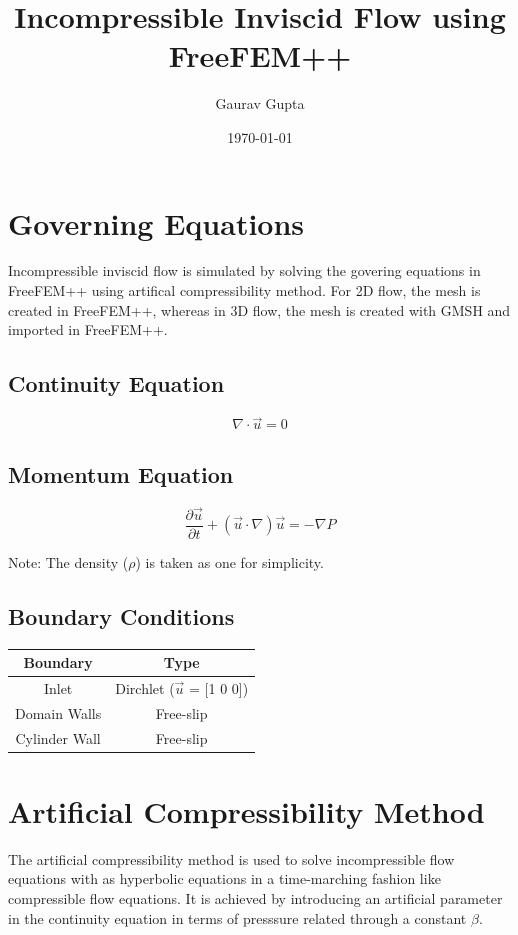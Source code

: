 \documentclass{article}
\title{Incompressible Inviscid Flow using FreeFEM++}
\author{Gaurav Gupta}
\date{\today}
\begin{document}
\maketitle %
\section{Governing Equations}
Incompressible inviscid flow is simulated by solving the govering equations in FreeFEM++
using artifical compressibility method. For 2D flow, the mesh is created in FreeFEM++, whereas
in 3D flow, the mesh is created with GMSH and imported in FreeFEM++.
\subsection*{Continuity Equation}
$$\nabla \cdot \vec{u}  = 0$$

\subsection*{Momentum Equation}
$$ \frac{\partial{\vec{u}}}{\partial{t}} + (\vec{u} \cdot \nabla) \vec{u} = - \nabla P $$

\noindent Note: The density ($\rho$) is taken as one for simplicity.

\subsection*{Boundary Conditions}
\begin{table}[H]
    \centering
    \begin{tabular}{||c|c||}
        \hline
        \textbf{Boundary} & \textbf{Type}                  \\
        \hline
        Inlet             & Dirchlet ($\vec{u}$ = [1 0 0]) \\
        \hline
        Domain Walls      & Free-slip                      \\
        \hline
        Cylinder Wall     & Free-slip                      \\
        \hline
    \end{tabular}
\end{table}
\section{Artificial Compressibility Method}
The artificial compressibility method is used to solve incompressible flow
equations with as hyperbolic equations in a time-marching fashion like compressible
flow equations. It is achieved by introducing an artificial parameter in the continuity
equation in terms of presssure related through a constant $\beta$.
\end{document}
